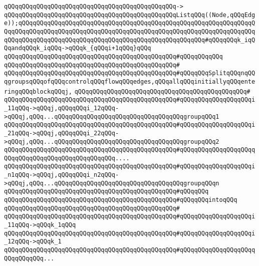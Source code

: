 \verb|qQQqqQQqqQQqqQQqqQQqqQQqqQQqqQQqqQQqqQQqqQQqqQQq->|\newline
\verb|qQQqqQQqqQQqqQQqqQQqqQQqqQQqqQQqqQQqqQQqqQQqqQQqListqQQq((Node,qQQqEdge));qQQqqQQqqQQqqQQqqQQqqQQqqQQqqQQqqQQqqQQqqQQqqQQqqQQqqQQqqQQqqQQqqQQqqQQqqQQqqQQqqQQqqQQqqQQqqQQqqQQqqQQqqQQqqQQqqQQqqQQqqQQqqQQqqQQqqQQqqQQqqQQqqQQqqQQqqQQqqQQqqQQqqQQqqQQqqQQqqQQqqQQqqQQqqQQq#qQQqqQQqk_iqQQqandqQQqk_iqQQq->qQQqk_{qQQqi+1qQQq}qQQq|\newline
\verb|qQQqqQQqqQQqqQQqqQQqqQQqqQQqqQQqqQQqqQQqqQQqqQQq#qQQqqQQqqQQq|\newline
\verb|qQQqqQQqqQQqqQQqqQQqqQQqqQQqqQQqqQQqqQQqqQQqqQQq#|\newline
\verb|qQQqqQQqqQQqqQQqqQQqqQQqqQQqqQQqqQQqqQQqqQQqqQQq#qQQqqQQqSplitqQQqnqQQqgroupsqQQqofqQQqcontrolqQQqflowqQQqedges,qQQqallqQQqinitiallyqQQqenteringqQQqblockqQQqj,|\newline
\verb|qQQqqQQqqQQqqQQqqQQqqQQqqQQqqQQqqQQqqQQqqQQqqQQq#|\newline
\verb|qQQqqQQqqQQqqQQqqQQqqQQqqQQqqQQqqQQqqQQqqQQqqQQq#qQQqqQQqqQQqqQQqqQQqi_11qQQq->qQQqj,qQQqqQQqi_12qQQq->qQQqj,qQQq...qQQqqQQqqQQqqQQqqQQqqQQqqQQqqQQqqQQqgroupqQQq1|\newline
\verb|qQQqqQQqqQQqqQQqqQQqqQQqqQQqqQQqqQQqqQQqqQQqqQQq#qQQqqQQqqQQqqQQqqQQqi_21qQQq->qQQqj,qQQqqQQqi_22qQQq->qQQqj,qQQq...qQQqqQQqqQQqqQQqqQQqqQQqqQQqqQQqqQQqgroupqQQq2|\newline
\verb|qQQqqQQqqQQqqQQqqQQqqQQqqQQqqQQqqQQqqQQqqQQqqQQq#qQQqqQQqqQQqqQQqqQQqqQQqqQQqqQQqqQQqqQQqqQQqqQQqqQQq....|\newline
\verb|qQQqqQQqqQQqqQQqqQQqqQQqqQQqqQQqqQQqqQQqqQQqqQQq#qQQqqQQqqQQqqQQqqQQqi_n1qQQq->qQQqj,qQQqqQQqi_n2qQQq->qQQqj,qQQq...qQQqqQQqqQQqqQQqqQQqqQQqqQQqqQQqqQQqgroupqQQqn|\newline
\verb|qQQqqQQqqQQqqQQqqQQqqQQqqQQqqQQqqQQqqQQqqQQqqQQq#qQQqqQQq|\newline
\verb|qQQqqQQqqQQqqQQqqQQqqQQqqQQqqQQqqQQqqQQqqQQqqQQq#qQQqqQQqintoqQQq|\newline
\verb|qQQqqQQqqQQqqQQqqQQqqQQqqQQqqQQqqQQqqQQqqQQqqQQq#|\newline
\verb|qQQqqQQqqQQqqQQqqQQqqQQqqQQqqQQqqQQqqQQqqQQqqQQq#qQQqqQQqqQQqqQQqqQQqi_11qQQq->qQQqk_1qQQq|\newline
\verb|qQQqqQQqqQQqqQQqqQQqqQQqqQQqqQQqqQQqqQQqqQQqqQQq#qQQqqQQqqQQqqQQqqQQqi_12qQQq->qQQqk_1|\newline
\verb|qQQqqQQqqQQqqQQqqQQqqQQqqQQqqQQqqQQqqQQqqQQqqQQq#qQQqqQQqqQQqqQQqqQQqqQQqqQQqqQQq...|\newline
